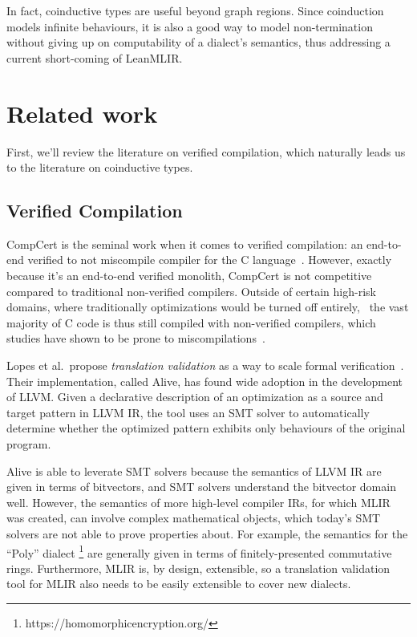 \documentclass[a4paper]{scrartcl}
\begin{document}
In fact, coinductive types are useful beyond graph regions. Since
coinduction models infinite behaviours, it is also a good way to model
non-termination without giving up on computability of a dialect's
semantics, thus addressing a current short-coming of LeanMLIR.



\section{Related work}\label{related-work}

First, we'll review the literature on verified compilation, which
naturally leads us to the literature on coinductive types.

\subsection{Verified Compilation}\label{verified-compilation}

CompCert is the
seminal work when it comes to verified compilation: an end-to-end
verified to not miscompile compiler for the C language~\cite{leroyCompCertFormallyVerified}.
However, exactly
because it's an end-to-end verified monolith, CompCert is not
competitive compared to traditional non-verified compilers. Outside of
certain high-risk domains, where traditionally optimizations would be
turned off entirely,~\cite{kastnerCompCertPracticalExperience} the
vast majority of C code is thus still compiled with non-verified
compilers, which studies have shown to be prone to miscompilations~\cite{yangFindingUnderstandingBugs2011}.

Lopes et al.~propose \emph{translation validation} as a way to scale
formal verification~\cite{lopesAlive2BoundedTranslation2021}.
Their implementation, called Alive, has found wide adoption in the
development of LLVM. Given a declarative description of an optimization
as a source and target pattern in LLVM IR, the tool uses an SMT solver
to automatically determine whether the optimized pattern exhibits only
behaviours of the original program.

Alive is able to leverate SMT solvers because the semantics of LLVM IR
are given in terms of bitvectors, and SMT solvers understand the
bitvector domain well. However, the semantics of more high-level
compiler IRs, for which MLIR was created, can involve complex
mathematical objects, which today's SMT solvers are not able to prove
properties about. For example, the semantics for the ``Poly'' dialect
\footnote{https://homomorphicencryption.org/} are generally given in
terms of finitely-presented commutative rings. Furthermore, MLIR is, by
design, extensible, so a translation validation tool for MLIR also needs
to be easily extensible to cover new dialects.
\end{document}
